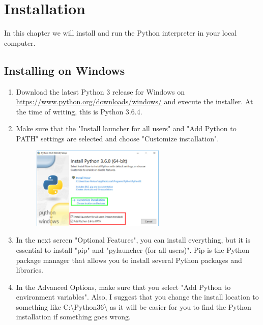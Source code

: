 \chapter{Installation}\label{installation}

In this chapter we will install and run the Python interpreter in your local computer.

\section{Installing on Windows}

\begin{enumerate}

\item Download the latest Python 3 release for Windows on \url{https://www.python.org/downloads/windows/} and execute the installer. At the time of writing, this is Python 3.6.4.

\item Make sure that the "Install launcher for all users" and "Add Python to PATH" settings are selected and choose "Customize installation".

\begin{figure}[H]
	\centering
  	\includegraphics[width=0.6\textwidth]{images/python_windows.jpg}
\end{figure}

\item In the next screen "Optional Features", you can install everything, but it is essential to install "pip" and "pylauncher (for all users)". Pip is the Python package manager that allows you to install several Python packages and libraries.

\item In the Advanced Options, make sure that you select "Add Python to environment variables". Also, I suggest that you change the install location to something like C:{\textbackslash}Python36{\textbackslash} as it will be easier for you to find the Python installation if something goes wrong.


\end{enumerate}
